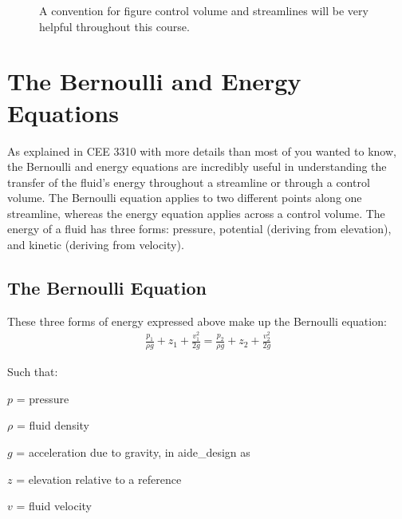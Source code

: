 \documentclass[letterpaper,10pt,english]{sphinxmanual}
\let\sphinxpxdimen\pdfpxdimen\else\newdimen\sphinxpxdimen
\begin{document}
\begin{figure}[htbp]
\centering
\capstart

\noindent\sphinxincludegraphics[width=650\sphinxpxdimen]{{image_control_volumes}.png}
\caption{A convention for figure control volume and streamlines will be very helpful throughout this course.}\label{\detokenize{Fluids_Review/Fluids_Review_Design:id15}}\label{\detokenize{Fluids_Review/Fluids_Review_Design:image-control-volumes}}\end{figure}


\section{The Bernoulli and Energy Equations}
\label{\detokenize{Fluids_Review/Fluids_Review_Design:the-bernoulli-and-energy-equations}}\label{\detokenize{Fluids_Review/Fluids_Review_Design:bernoulli-and-energy-equations}}
As explained in CEE 3310 with more details than most of you wanted to know, the Bernoulli and energy equations are incredibly useful in understanding the transfer of the fluid’s energy throughout a streamline or through a control volume. The Bernoulli equation applies to two different points along one streamline, whereas the energy equation applies across a control volume. The energy of a fluid has three forms: pressure, potential (deriving from elevation), and kinetic (deriving from velocity).


\subsection{The Bernoulli Equation}
\label{\detokenize{Fluids_Review/Fluids_Review_Design:the-bernoulli-equation}}\label{\detokenize{Fluids_Review/Fluids_Review_Design:bernoulli-equation}}
These three forms of energy expressed above make up the Bernoulli equation:
\begin{equation}\label{equation:Fluids_Review/Fluids_Review_Design:Fluids_Review/Fluids_Review_Design:6}
\begin{split}\frac{p_1}{\rho g} + {z_1} + \frac{v_1^2}{2g} = \frac{p_2}{\rho g} + {z_2} + \frac{v_2^2}{2g}\end{split}
\end{equation}
\begin{DUlineblock}{0em}
\item[] Such that:
\item[] \(p\) = pressure
\item[] \(\rho\) = fluid density
\item[] \(g\) = acceleration due to gravity, in aide\_design as 
\item[] \(z\) = elevation relative to a reference
\item[] \(v\) = fluid velocity
\end{DUlineblock}
\end{document}
